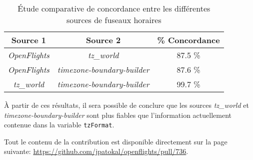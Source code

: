 \begin{table}
	\centering
	\begin{tabular}{ccc}
		\textbf{Source 1} & \textbf{Source 2} & \textbf{\% Concordance} \\
		\hline
		\emph{OpenFlights} & \emph{tz\_world} & 87.5 \% \\
		\emph{OpenFlights} & \emph{{timezone-boundary-builder}} & 87.6 \% \\
		\emph{tz\_world} & \emph{{timezone-boundary-builder}} & 99.7 \%	
	\end{tabular}
	\caption{Étude comparative de concordance entre les différentes sources de fuseaux horaires}
	\label{tab:tzConsistency}
\end{table}

À partir de ces résultats, il sera possible de conclure que les sources \emph{tz\_world} et \emph{{timezone-boundary-builder}} sont plus fiables que l'information actuellement contenue dans la variable \texttt{tzFormat}. 

Tout le contenu de la contribution est disponible directement sur la page suivante: \url{https://github.com/jpatokal/openflights/pull/736}.